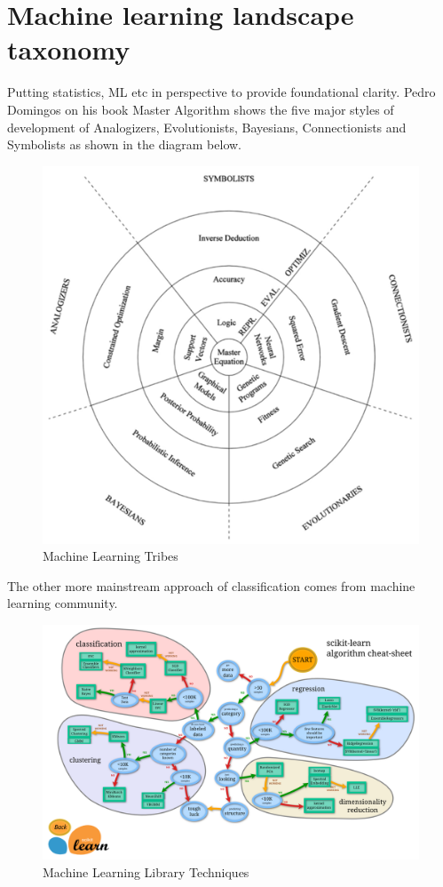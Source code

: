\documentclass[11pt]{amsart}
\begin{document}
\section{Machine learning landscape taxonomy}
Putting statistics, ML etc in perspective to provide foundational clarity. Pedro Domingos on his book Master Algorithm shows the five major styles of development of Analogizers, Evolutionists, Bayesians, Connectionists and Symbolists as shown in the diagram below.
\begin{figure}[H]
\centering
  \includegraphics[scale=0.75]{ml-tribes.png}
  \caption{Machine Learning Tribes}
  \label{fig:congress}
\end{figure}
The other more mainstream approach of classification comes from machine learning community. 
\begin{figure}[H]
\centering
  \includegraphics[width=\linewidth]{ml-map.png}
  \caption{Machine Learning Library Techniques}
  \label{fig:congress}
\end{figure}
\end{document}
